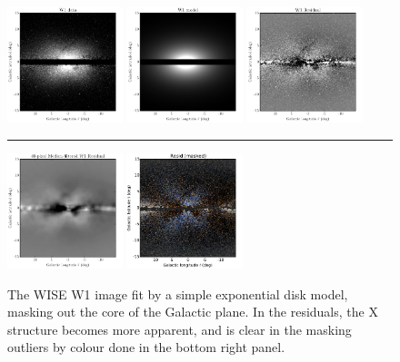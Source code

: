 \documentclass[12pt, preprint]{aastex}
\begin{document}
\begin{figure}[h!]
\centering
\includegraphics[width=0.3\textwidth]{xbulge-04}
\includegraphics[width=0.3\textwidth]{xbulge-08}
\includegraphics[width=0.3\textwidth]{xbulge-09}
\\
\rule{0.3\textwidth}{0pt}
\includegraphics[width=0.3\textwidth]{xbulge-10}
\includegraphics[width=0.3\textwidth]{xbulge-12}
\caption{The WISE W1 image fit by a simple exponential disk model, masking
  out the core of the Galactic plane.  In the residuals, the X
  structure becomes more apparent, and is clear in the masking outliers by colour done in the bottom right panel.}
\label{fig:modfit}
\end{figure}
\end{document}
